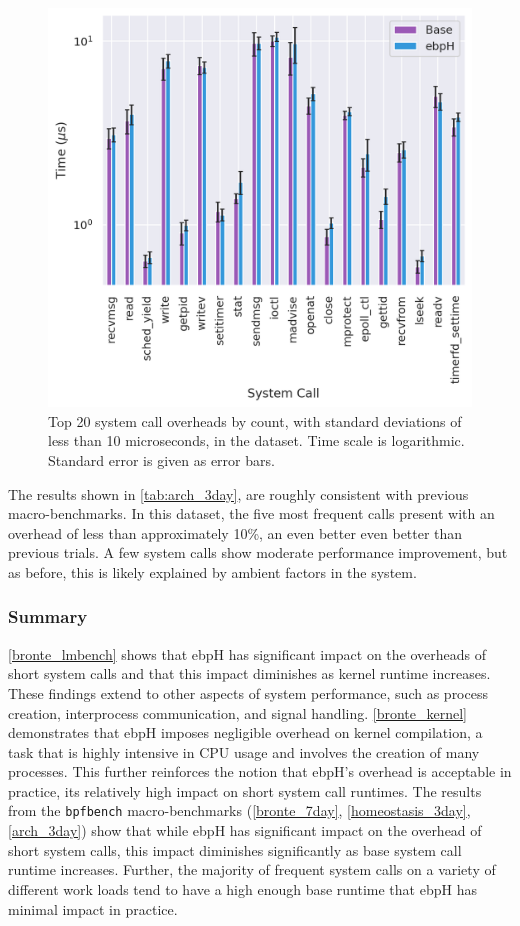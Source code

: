 \documentclass[
  12pt]{findlay}
\newcommand{\passthrough}[1]{#1}
\begin{document}
\begin{figure}
    \caption[Top 20 system call overheads by count in the  dataset]{
        Top 20 system call overheads by count, with standard deviations of less than 10 microseconds,
        in the  dataset.
        Time scale is logarithmic. Standard error is given as error bars.
    }
    \label{fig:arch_3day}
    \includegraphics[width=.8\textwidth]{../data/bench/arch-3day/arch_3day_times.png}
\end{figure}

The results shown in \autoref{tab:arch_3day}, are roughly consistent
with previous macro-benchmarks. In this dataset, the five most frequent
calls present with an overhead of less than approximately 10\%, an even
better even better than previous trials. A few system calls show
moderate performance improvement, but as before, this is likely
explained by ambient factors in the system.

\hypertarget{summary}{%
\subsubsection{Summary}\label{summary}}

\autoref{bronte_lmbench} shows that ebpH has significant impact on the
overheads of short system calls and that this impact diminishes as
kernel runtime increases. These findings extend to other aspects of
system performance, such as process creation, interprocess
communication, and signal handling. \autoref{bronte_kernel} demonstrates
that ebpH imposes negligible overhead on kernel compilation, a task that
is highly intensive in CPU usage and involves the creation of many
processes. This further reinforces the notion that ebpH's overhead is
acceptable in practice, its relatively high impact on short system call
runtimes. The results from the \passthrough{\lstinline!bpfbench!}
macro-benchmarks (\autoref{bronte_7day}, \autoref{homeostasis_3day},
\autoref{arch_3day}) show that while ebpH has significant impact on the
overhead of short system calls, this impact diminishes significantly as
base system call runtime increases. Further, the majority of frequent
system calls on a variety of different work loads tend to have a high
enough base runtime that ebpH has minimal impact in practice.
\end{document}
